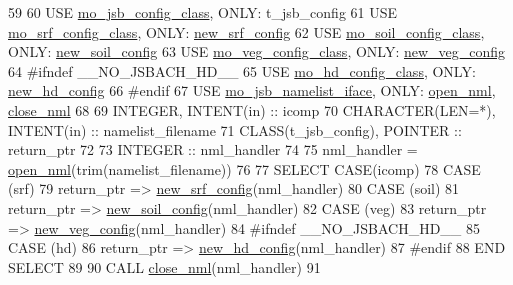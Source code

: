\begin{DoxyCode}
59 
60     \textcolor{keywordtype}{USE }\hyperlink{namespacemo__jsb__config__class}{mo\_jsb\_config\_class}\textcolor{keywordtype}{,   ONLY}: t\_jsb\_config
61     \textcolor{keywordtype}{USE }\hyperlink{namespacemo__srf__config__class}{mo\_srf\_config\_class}\textcolor{keywordtype}{,   ONLY}: \hyperlink{namespacemo__srf__config__class_ab74df301c0b4a0a8c1b10dfd0fdee25c}{new\_srf\_config}
62     \textcolor{keywordtype}{USE }\hyperlink{namespacemo__soil__config__class}{mo\_soil\_config\_class}\textcolor{keywordtype}{,  ONLY}: \hyperlink{namespacemo__soil__config__class_a5093e53abf20433b31866a3ccf4a9632}{new\_soil\_config}
63     \textcolor{keywordtype}{USE }\hyperlink{namespacemo__veg__config__class}{mo\_veg\_config\_class}\textcolor{keywordtype}{,   ONLY}: \hyperlink{namespacemo__veg__config__class_ad45bc88a338969c3c20ca8780a84747e}{new\_veg\_config}
64 \textcolor{preprocessor}{#ifndef \_\_NO\_JSBACH\_HD\_\_}
65 \textcolor{preprocessor}{}    \textcolor{keywordtype}{USE }\hyperlink{namespacemo__hd__config__class}{mo\_hd\_config\_class}\textcolor{keywordtype}{,    ONLY}: \hyperlink{namespacemo__hd__config__class_acc4bf17e3db786bdbe4c6634717b53f7}{new\_hd\_config}
66 \textcolor{preprocessor}{#endif}
67 \textcolor{preprocessor}{}    \textcolor{keywordtype}{USE }\hyperlink{namespacemo__jsb__namelist__iface}{mo\_jsb\_namelist\_iface}\textcolor{keywordtype}{, ONLY}: \hyperlink{namespacemo__jsb__namelist__iface_abb2821ffd4c30375faa307d522af3bcb}{open\_nml}, 
      \hyperlink{namespacemo__jsb__namelist__iface_a240047c255ab5bb3871ecdcdcd6d6a92}{close\_nml}
68 
69     \textcolor{keywordtype}{INTEGER}, \textcolor{keywordtype}{INTENT(in)} :: icomp
70     \textcolor{keywordtype}{CHARACTER(LEN=*)}, \textcolor{keywordtype}{INTENT(in)} :: namelist\_filename
71     \textcolor{keywordtype}{CLASS}(t\_jsb\_config), \textcolor{keywordtype}{POINTER} :: return\_ptr
72 
73     \textcolor{keywordtype}{INTEGER} :: nml\_handler
74 
75     nml\_handler = \hyperlink{namespacemo__jsb__namelist__iface_abb2821ffd4c30375faa307d522af3bcb}{open\_nml}(trim(namelist\_filename))
76 
77     \textcolor{keywordflow}{SELECT CASE}(icomp)
78     \textcolor{keywordflow}{CASE} (srf)
79       return\_ptr  => \hyperlink{namespacemo__srf__config__class_ab74df301c0b4a0a8c1b10dfd0fdee25c}{new\_srf\_config}(nml\_handler)
80     \textcolor{keywordflow}{CASE} (soil)
81       return\_ptr => \hyperlink{namespacemo__soil__config__class_a5093e53abf20433b31866a3ccf4a9632}{new\_soil\_config}(nml\_handler)
82     \textcolor{keywordflow}{CASE} (veg)
83       return\_ptr  => \hyperlink{namespacemo__veg__config__class_ad45bc88a338969c3c20ca8780a84747e}{new\_veg\_config}(nml\_handler)
84 \textcolor{preprocessor}{#ifndef \_\_NO\_JSBACH\_HD\_\_}
85 \textcolor{preprocessor}{}    \textcolor{keywordflow}{CASE} (hd)
86       return\_ptr => \hyperlink{namespacemo__hd__config__class_acc4bf17e3db786bdbe4c6634717b53f7}{new\_hd\_config}(nml\_handler)
87 \textcolor{preprocessor}{#endif}
88 \textcolor{preprocessor}{}\textcolor{keywordflow}{    END SELECT}
89 
90     \textcolor{keyword}{CALL }\hyperlink{namespacemo__jsb__namelist__iface_a240047c255ab5bb3871ecdcdcd6d6a92}{close\_nml}(nml\_handler)
91 
\end{DoxyCode}


